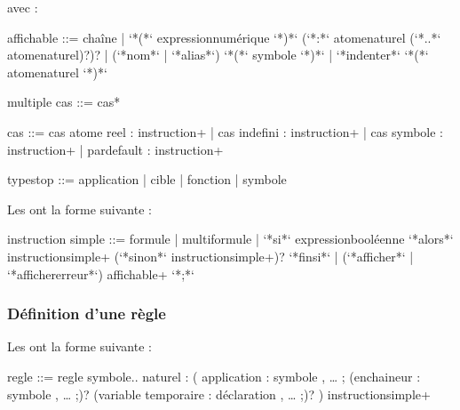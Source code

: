 \documentclass[letterpaper,10pt,french]{sphinxmanual}
\begin{document}
\sphinxAtStartPar
avec :

\begin{sphinxVerbatim}[commandchars=\\\{\}]
\PYGZlt{}affichable\PYGZgt{} ::=
  \PYGZlt{}chaîne\PYGZgt{} 
  | `*(*` \PYGZlt{}expression\PYGZti{}numérique\PYGZgt{} `*)*`
    (`*:*` \PYGZlt{}atome\PYGZti{}naturel\PYGZgt{} (`*..*` \PYGZlt{}atome\PYGZti{}naturel\PYGZgt{})?)? 
  | (`*nom*` | `*alias*`) `*(*` \PYGZlt{}symbole\PYGZgt{} `*)*` 
  | `*indenter*` `*(*` \PYGZlt{}atome\PYGZti{}naturel\PYGZgt{} `*)*`

\PYGZlt{}multiple cas\PYGZgt{} ::= \PYGZlt{}cas\PYGZgt{}*

\PYGZlt{}cas\PYGZgt{} ::=
  cas \PYGZlt{}atome reel\PYGZgt{} : \PYGZlt{}instruction\PYGZgt{}+
  | cas indefini : \PYGZlt{}instruction\PYGZgt{}+
  | cas \PYGZlt{}symbole\PYGZgt{} : \PYGZlt{}instruction\PYGZgt{}+
  | par\PYGZus{}default : \PYGZlt{}instruction\PYGZgt{}+

\PYGZlt{}type\PYGZus{}stop\PYGZgt{} ::=
  application
  | cible
  | fonction
  | \PYGZlt{}symbole\PYGZgt{}
\end{sphinxVerbatim}

\sphinxAtStartPar
Les  ont la forme suivante :

\begin{sphinxVerbatim}[commandchars=\\\{\}]
\PYGZlt{}instruction simple\PYGZgt{} ::= 
  \PYGZlt{}formule\PYGZgt{} 
  | \PYGZlt{}multi\PYGZhy{}formule\PYGZgt{} 
  | `*si*` \PYGZlt{}expression\PYGZti{}booléenne\PYGZgt{}
    `*alors*` \PYGZlt{}instruction\PYGZti{}simple\PYGZgt{}+
    (`*sinon*` \PYGZlt{}instruction\PYGZti{}simple\PYGZgt{}+)?
    `*finsi*` 
  | (`*afficher*` | `*afficher\PYGZus{}\PYGZus{}erreur*`) \PYGZlt{}affichable\PYGZgt{}+ `*;*`
\end{sphinxVerbatim}


\subsubsection{Définition d’une règle}
\label{\detokenize{syntax:definition-d-une-regle}}
\sphinxAtStartPar
Les  ont la forme suivante :

\begin{sphinxVerbatim}[commandchars=\\\{\}]
\PYGZlt{}regle\PYGZgt{} ::= 
 regle \PYGZlt{}symbole\PYGZgt{}.. \PYGZlt{}naturel\PYGZgt{} :
    ( 
      application : \PYGZlt{}symbole\PYGZgt{} , … ; 
      \PYGZca{}\PYGZca{} (enchaineur : \PYGZlt{}symbole\PYGZgt{} , … ;)? 
      \PYGZca{}\PYGZca{} (variable temporaire : \PYGZlt{}déclaration\PYGZgt{} , … ;)? 
    ) 
    \PYGZlt{}instruction\PYGZti{}simple\PYGZgt{}+
\end{sphinxVerbatim}
\end{document}
